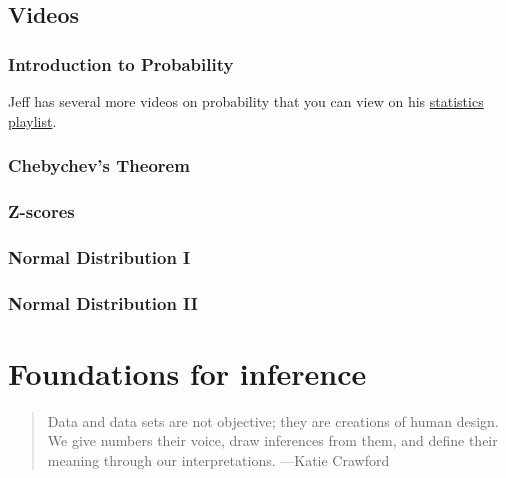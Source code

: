 \documentclass[
  letterpaper,
  DIV=11,
  numbers=noendperiod]{scrreprt}
\begin{document}
\section{Videos}\label{videos-2}

\subsection{Introduction to
Probability}\label{introduction-to-probability}

Jeff has several more videos on probability that you can view on his
\href{https://www.youtube.com/playlist?list=PLKXdxQAT3tCvuex_E1ZnQYaw897ELUSaI}{statistics
playlist}.

\subsection{Chebychev's Theorem}\label{chebychevs-theorem}

\subsection{Z-scores}\label{z-scores-1}

\subsection{Normal Distribution I}\label{normal-distribution-i}

\subsection{Normal Distribution II}\label{normal-distribution-ii}


\chapter{Foundations for inference}\label{foundations-for-inference}

\begin{quote}
Data and data sets are not objective; they are creations of human
design. We give numbers their voice, draw inferences from them, and
define their meaning through our interpretations. ---Katie Crawford
\end{quote}
\end{document}
